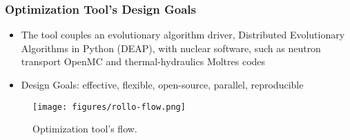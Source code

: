 \begin{frame}
    \frametitle{Optimization Tool's Design Goals}
    \begin{minipage}[c]{0.45\textwidth}
    \begin{itemize}
        \item The tool couples an evolutionary algorithm driver, Distributed 
        Evolutionary Algorithms in Python (DEAP), with 
        nuclear software, such as neutron transport OpenMC and thermal-hydraulics 
        Moltres codes
        \item Design Goals: effective, flexible, open-source, parallel,
        reproducible
    \end{itemize}
    \end{minipage}\hfill
    \begin{minipage}[c]{0.52\textwidth}
        \centering
        \begin{figure}
            \texttt{[image: figures/rollo-flow.png]} 
            \caption{Optimization tool's flow.}
        \end{figure}
    \end{minipage}
\end{frame}
